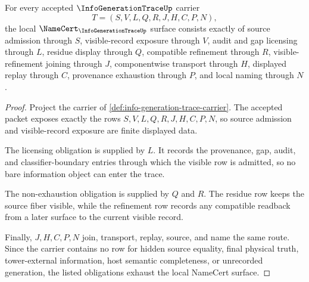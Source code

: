 \begin{theorem}
\label{thm:info-generation-trace-namecert-obligations}
For every accepted $\InfoGenerationTraceUp$ carrier
$$
T=(S,V,L,Q,R,J,H,C,P,N),
$$
the local $\NameCert_{\InfoGenerationTraceUp}$ surface consists exactly of source admission through $S$, visible-record exposure through $V$, audit and gap licensing through $L$, residue display through $Q$, compatible refinement through $R$, visible-refinement joining through $J$, componentwise transport through $H$, displayed replay through $C$, provenance exhaustion through $P$, and local naming through $N$.
\end{theorem}
\begin{proof}
Project the carrier of \autoref{def:info-generation-trace-carrier}. The accepted packet exposes exactly the rows $S,V,L,Q,R,J,H,C,P,N$, so source admission and visible-record exposure are finite displayed data.

The licensing obligation is supplied by $L$. It records the provenance, gap, audit, and classifier-boundary entries through which the visible row is admitted, so no bare information object can enter the trace.

The non-exhaustion obligation is supplied by $Q$ and $R$. The residue row keeps the source fiber visible, while the refinement row records any compatible readback from a later surface to the current visible record.

Finally, $J,H,C,P,N$ join, transport, replay, source, and name the same route. Since the carrier contains no row for hidden source equality, final physical truth, tower-external information, host semantic completeness, or unrecorded generation, the listed obligations exhaust the local NameCert surface.
\end{proof}

